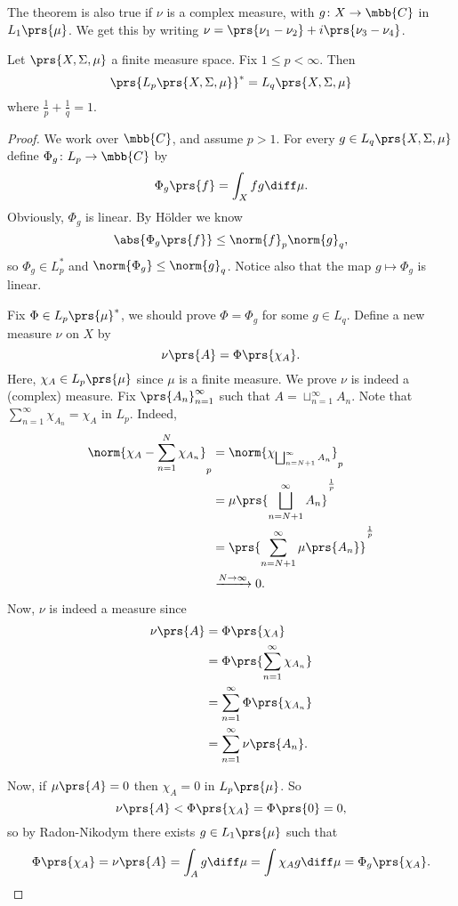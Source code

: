 \documentclass[10pt, twoside]{book}
\begin{document}
\begin{remark}
The theorem is also true if $\nu$ is a complex measure, with $g \colon X \to \mbb{C}$ in $L_1\prs{\mu}$. We get this by writing $\nu = \prs{\nu_1 - \nu_2} + i\prs{\nu_3 - \nu_4}$.
\end{remark}

\begin{theorem}
Let $\prs{X, \Sigma, \mu}$ a finite measure space. Fix $1 \leq p < \infty$. Then \[\prs{L_p\prs{X, \Sigma, \mu}}^* = L_q\prs{X, \Sigma, \mu}\]
where $\frac{1}{p} + \frac{1}{q} = 1$.
\end{theorem}

\begin{proof}
We work over $\mbb{C}$, and assume $p > 1$.
For every $g \in L_q\prs{X, \Sigma, \mu}$ define $\Phi_g \colon L_p \to \mbb{C}$ by
\[\Phi_g\prs{f} = \int_X f g \diff \mu \text{.}\]
Obviously, $\Phi_g$ is linear.
By Hölder we know
\[\abs{\Phi_g\prs{f}} \leq \norm{f}_p \norm{g}_q \text{,}\]
so $\Phi_g \in L_p^*$ and $\norm{\Phi_g} \leq \norm{g}_q$.
Notice also that the map $g \mapsto \Phi_g$ is linear.

Fix $\Phi \in L_p\prs{\mu}^*$, we should prove $\Phi = \Phi_g$ for some $g \in L_q$.
Define a new measure $\nu$ on $X$ by
\[\nu\prs{A} = \Phi\prs{\chi_A} \text{.}\]
Here, $\chi_A \in L_p\prs{\mu}$ since $\mu$ is a finite measure.
We prove $\nu$ is indeed a (complex) measure.
Fix $\prs{A_n}_{n=1}^{\infty}$ such that $A = \sqcup_{n=1}^{\infty} A_n$. Note that $\sum_{n=1}^{\infty} \chi_{A_n} = \chi_A$ in $L_p$.
Indeed,
\begin{align*}
\norm{\chi_A - \sum_{n=1}^N \chi_{A_n}}_p &=
\norm{\chi_{\bigsqcup_{n=N+1}^\infty A_n}}_p
\\&= \mu\prs{\bigsqcup_{n=N+1}^\infty A_n}^{\frac{1}{p}}
\\&= \prs{\sum_{n=N+1}^\infty \mu\prs{A_n}}^{\frac{1}{p}}
\\&\xrightarrow{N \to \infty} 0 \text{.}
\end{align*}
Now, $\nu$ is indeed a measure since
\begin{align*}
\nu\prs{A} &= \Phi\prs{\chi_A}
\\&=
\Phi\prs{\sum_{n=1}^{\infty} \chi_{A_n}}
\\&= \sum_{n=1}^{\infty} \Phi\prs{\chi_{A_n}}
\\&= \sum_{n=1}^\infty \nu\prs{A_n} \text{.}
\end{align*}

Now, if $\mu\prs{A} = 0$ then $\chi_A = 0$ in $L_p\prs{\mu}$. So
\[\nu\prs{A} < \Phi\prs{\chi_A} = \Phi\prs{0} = 0 \text{,}\]
so by Radon-Nikodym there exists $g \in L_1\prs{\mu}$ such that
\[\Phi\prs{\chi_A} = \nu\prs{A} = \int_A g \diff \mu = \int \chi_A g \diff \mu = \Phi_g\prs{\chi_A} \text{.}\]


\end{proof}
\end{document}
